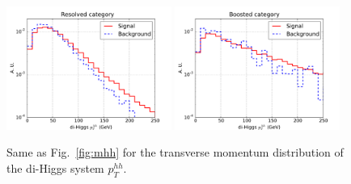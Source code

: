 \begin{figure}[t]
\begin{center}
  \includegraphics[width=0.48\textwidth]{plots/pt_HH_res_C1.pdf}
  \includegraphics[width=0.48\textwidth]{plots/pt_HH_boost_C1.pdf}
  \caption{\small Same as Fig.~\ref{fig:mhh} for the transverse momentum
    distribution of the di-Higgs system $p_T^{hh}$.
}
\label{fig:pthh}
\end{center}
\end{figure}

